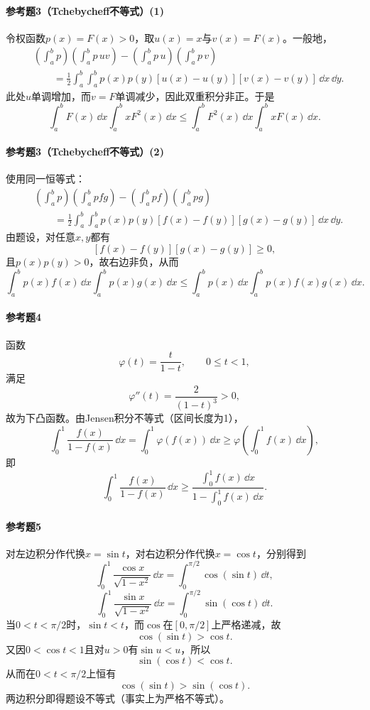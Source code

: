 \paragraph{参考题3（Tchebycheff不等式）(1)}
\begin{xsolution}
令权函数$p(x)=F(x)>0$，取$u(x)=x$与$v(x)=F(x)$。一般地，
\begin{align*}
&\left(\int_a^bp\right)\left(\int_a^bp\,uv\right)
 -\left(\int_a^bp\,u\right)\left(\int_a^bp\,v\right)\\
&\qquad=\frac12\int_a^b\int_a^bp(x)p(y)
 [u(x)-u(y)][v(x)-v(y)]\,\dd x\,\dd y.
\end{align*}
此处$u$单调增加，而$v=F$单调减少，因此双重积分非正。于是
\[
 \int_a^bF(x)\,\dd x\int_a^bxF^2(x)\,\dd x
 \le\int_a^bF^2(x)\,\dd x\int_a^bxF(x)\,\dd x.
\]
\end{xsolution}

\paragraph{参考题3（Tchebycheff不等式）(2)}
\begin{xsolution}
使用同一恒等式：
\begin{align*}
&\left(\int_a^bp\right)\left(\int_a^bpfg\right)
 -\left(\int_a^bpf\right)
 \left(\int_a^bpg\right)\\
&\qquad=\frac12\int_a^b\int_a^bp(x)p(y)
 [f(x)-f(y)][g(x)-g(y)]\,\dd x\,\dd y.
\end{align*}
由题设，对任意$x,y$都有
\[
 [f(x)-f(y)][g(x)-g(y)]\ge0,
\]
且$p(x)p(y)>0$，故右边非负，从而
\[
 \int_a^bp(x)f(x)\,\dd x\int_a^bp(x)g(x)\,\dd x
 \le\int_a^bp(x)\,\dd x\int_a^bp(x)f(x)g(x)\,\dd x.
\]
\end{xsolution}

\paragraph{参考题4}
\begin{xsolution}
函数
\[
 \varphi(t)=\frac{t}{1-t},\qquad 0\le t<1,
\]
满足
\[
 \varphi''(t)=\frac{2}{(1-t)^3}>0,
\]
故为下凸函数。由Jensen积分不等式（区间长度为1），
\[
 \int_0^1\frac{f(x)}{1-f(x)}\,\dd x
 =\int_0^1\varphi(f(x))\,\dd x
 \ge\varphi\left(\int_0^1f(x)\,\dd x\right),
\]
即
\[
 \int_0^1\frac{f(x)}{1-f(x)}\,\dd x
 \ge\frac{\int_0^1f(x)\,\dd x}{1-\int_0^1f(x)\,\dd x}.
\]
\end{xsolution}

\paragraph{参考题5}
\begin{xsolution}
对左边积分作代换$x=\sin t$，对右边积分作代换$x=\cos t$，分别得到
\[
 \int_0^1\frac{\cos x}{\sqrt{1-x^2}}\,\dd x
 =\int_0^{\pi/2}\cos(\sin t)\,\dd t,
\]
\[
 \int_0^1\frac{\sin x}{\sqrt{1-x^2}}\,\dd x
 =\int_0^{\pi/2}\sin(\cos t)\,\dd t.
\]
当$0<t<\pi/2$时，$\sin t<t$，而$\cos$在$[0,\pi/2]$上严格递减，故
\[
 \cos(\sin t)>\cos t.
\]
又因$0<\cos t<1$且对$u>0$有$\sin u<u$，所以
\[
 \sin(\cos t)<\cos t.
\]
从而在$0<t<\pi/2$上恒有
\[
 \cos(\sin t)>\sin(\cos t).
\]
两边积分即得题设不等式（事实上为严格不等式）。
\end{xsolution}

